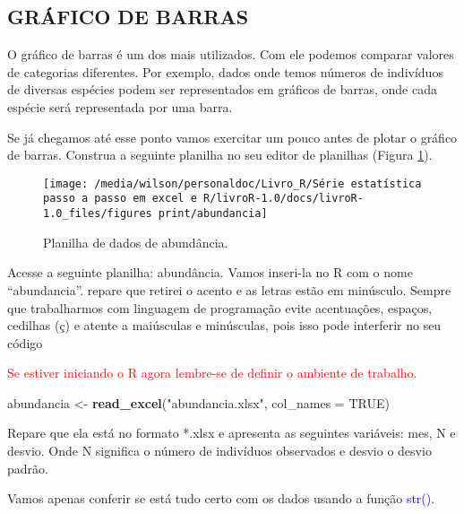 \documentclass[titlepage, oneside, openany, a4paper]{book}
\newenvironment{Shaded}{\begin{snugshade}}{\end{snugshade}}
\newcommand{\DataTypeTok}[1]{\textcolor[rgb]{0.13,0.29,0.53}{#1}}
\newcommand{\KeywordTok}[1]{\textcolor[rgb]{0.13,0.29,0.53}{\textbf{#1}}}
\newcommand{\NormalTok}[1]{#1}
\newcommand{\OtherTok}[1]{\textcolor[rgb]{0.56,0.35,0.01}{#1}}
\newcommand{\StringTok}[1]{\textcolor[rgb]{0.31,0.60,0.02}{#1}}
\begin{document}
\hypertarget{gruxe1fico-de-barras}{%
\subsection{GRÁFICO DE BARRAS}\label{gruxe1fico-de-barras}}

O gráfico de barras é um dos mais utilizados. Com ele podemos comparar valores de categorias diferentes. Por exemplo, dados onde temos números de indivíduos de diversas espécies podem ser representados em gráficos de barras, onde cada espécie será representada por uma barra.

Se já chegamos até esse ponto vamos exercitar um pouco antes de plotar o gráfico de barras. Construa a seguinte planilha no seu editor de planilhas (Figura \ref{fig:abundancia}).

\begin{figure}

{\centering \texttt{[image: /media/wilson/personaldoc/Livro\_R/Série estatística passo a passo em excel e R/livroR-1.0/docs/livroR-1.0\_files/figures print/abundancia]} 

}

\caption{Planilha de dados de abundância.}\label{fig:abundancia}
\end{figure}

Acesse a seguinte planilha: abundância. Vamos inseri-la no R com o nome ``abundancia''. repare que retirei o acento e as letras estão em minúsculo. Sempre que trabalharmos com linguagem de programação evite acentuações, espaços, cedilhas (ç) e atente a maiúsculas e minúsculas, pois isso pode interferir no seu código

\textcolor{red}{Se estiver iniciando o R agora lembre-se de definir o ambiente de trabalho.}

\begin{Shaded}
\begin{Highlighting}[]
\NormalTok{abundancia <-}\StringTok{ }\KeywordTok{read_excel}\NormalTok{(}\StringTok{"abundancia.xlsx"}\NormalTok{, }\DataTypeTok{col_names =} \OtherTok{TRUE}\NormalTok{)}
\end{Highlighting}
\end{Shaded}

Repare que ela está no formato *.xlsx e apresenta as seguintes variáveis: mes, N e desvio. Onde N significa o número de indivíduos observados e desvio o desvio padrão.

Vamos apenas conferir se está tudo certo com os dados usando a função \textcolor{blue}{str()}.
\end{document}
